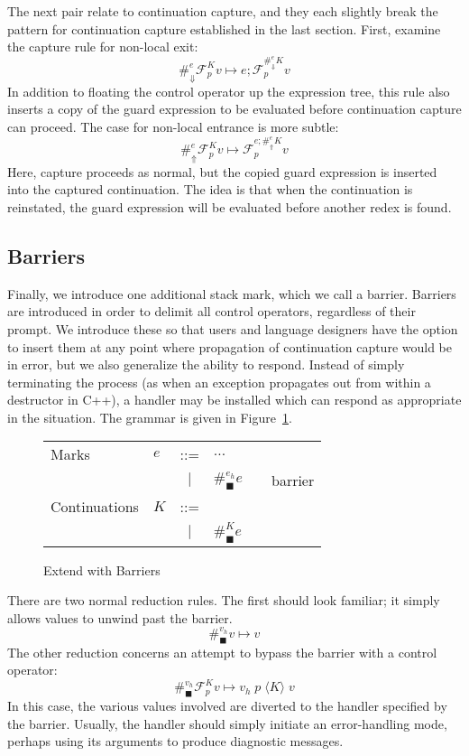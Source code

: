 \documentclass[11pt]{article}
\newcommand{\maybePage}{\null}
\newcommand\F{\mathcal{F}}
\newcommand{\angles}[1]{\langle#1\rangle}
\begin{document}
The next pair relate to continuation capture, and they each slightly break the pattern for continuation capture established in the last section.
First, examine the capture rule for non-local exit:
$$\#_{\Downarrow}^{e}\F_p^K v \mapsto e;\F_p^{\#_\Downarrow^{e}K}v$$
In addition to floating the control operator up the expression tree, this rule also inserts a copy of the guard expression to be evaluated before continuation capture can proceed.
The case for non-local entrance is more subtle:
$$\#_{\Uparrow}^{e}\F_p^K v \mapsto \F_p^{e;\#_\Uparrow^{e}K}v$$
Here, capture proceeds as normal, but the copied guard expression is inserted into the captured continuation.
The idea is that when the continuation is reinstated, the guard expression will be evaluated before another redex is found.

\maybePage
\subsection{Barriers}

Finally, we introduce one additional stack mark, which we call a barrier.
Barriers are introduced in order to delimit all control operators, regardless of their prompt.
We introduce these so that users and language designers have the option to insert them at any point where propagation of continuation capture would be in error, but we also generalize the ability to respond.
Instead of simply terminating the process (as when an exception propagates out from within a destructor in C++), a handler may be installed which can respond as appropriate in the situation.
The grammar is given in Figure~\ref{fig:addBarriers}.

\begin{figure}[H]
\caption{Extend with Barriers}
\label{fig:addBarriers}

\renewcommand{\arraystretch}{1.5}
\begin{tabular}{llclll}
Marks & $e$ & ::= & $\ldots$ &  \\
& & $|$ & $\#_\blacksquare^{e_h}e$ && barrier \\
Continuations & $K$ & ::= & \\
& & $|$ & $\#_{\blacksquare}^{K}e$ &&  \\
\end{tabular}
\end{figure}


There are two normal reduction rules.
The first should look familiar; it simply allows values to unwind past the barrier.
$$\#_\blacksquare^{v_h}v \mapsto v$$
The other reduction concerns an attempt to bypass the barrier with a control operator:
$$\#_\blacksquare^{v_h}\F_p^K v \mapsto v_h\;p\;\angles{K}\;v$$
In this case, the various values involved are diverted to the handler specified by the barrier.
Usually, the handler should simply initiate an error-handling mode, perhaps using its arguments to produce diagnostic messages.
\end{document}
